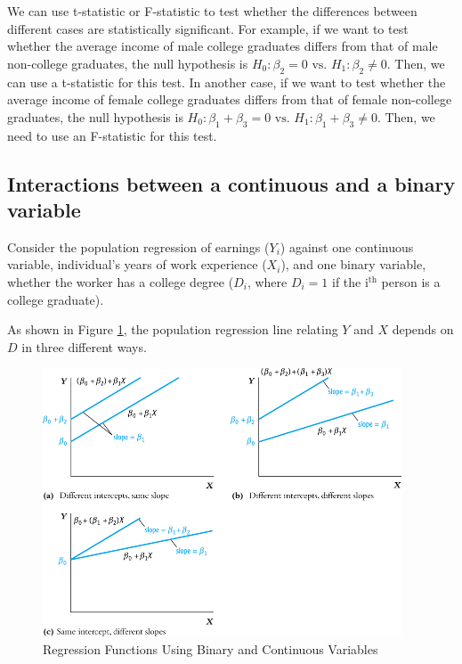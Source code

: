 \documentclass[a4paper,11pt]{article}
\begin{document}
\begin{itemize}
We can use t-statistic or F-statistic to test whether the differences
between different cases are statistically significant. For example, if
we want to test whether the average income of male college graduates
differs from that of male non-college graduates, the null hypothesis
is \(H_0: \beta_2 = 0 \text{ vs. } H_1: \beta_2 \neq 0\). Then, we can
use a t-statistic for this test. In another case, if we want to test
whether the average income of female college graduates differs from that
of female non-college graduates, the null hypothesis is \(H_0:
\beta_1 + \beta_3 = 0 \text{ vs. } H_1: \beta_1 + \beta_3 \neq
0\). Then, we need to use an F-statistic for this test.
\end{itemize}


\subsection{Interactions between a continuous and a binary variable}
\label{sec:org8a9d211}
Consider the population regression of earnings (\(Y_i\)) against one
continuous variable, individual's years of work experience (\(X_i\)),
and one binary variable, whether the worker has a college degree
(\(D_i\), where \(D_i=1\) if the i\(^{\text{th}}\) person is a college graduate).

As shown in Figure \ref{fig:org047aa70}, the population regression line relating \(Y\) and
\(X\) depends on \(D\) in three different ways.

\begin{figure}[htbp]
\centering
\includegraphics[width=0.95\textwidth]{img/fig-8-8.png}
\caption{\label{fig:org047aa70}
Regression Functions Using Binary and Continuous Variables}
\end{figure}
\end{document}
